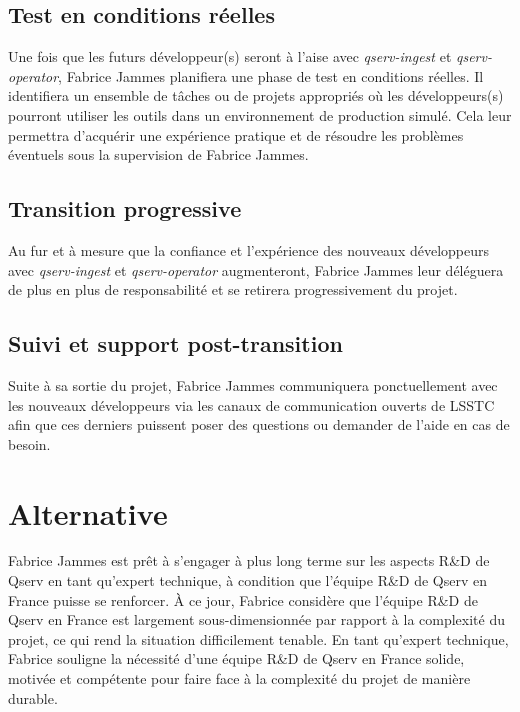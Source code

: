 \documentclass[french] {article}
\begin{document}
\subsection{Test en conditions réelles}

Une fois que les futurs développeur(s) seront à l'aise avec \textit{qserv-ingest} et \textit{qserv-operator}, Fabrice Jammes planifiera une phase de test en conditions réelles. Il identifiera un
ensemble de tâches ou de projets appropriés où les développeurs(s) pourront utiliser les outils dans un environnement de production simulé. Cela leur permettra d'acquérir une expérience pratique
et de résoudre les problèmes éventuels sous la supervision de Fabrice Jammes.

\subsection{Transition progressive}

Au fur et à mesure que la confiance et l'expérience des nouveaux développeurs avec \textit{qserv-ingest} et \textit{qserv-operator} augmenteront, Fabrice Jammes leur déléguera de plus en plus de
responsabilité et se retirera progressivement du projet.

\subsection{Suivi et support post-transition}

Suite à sa sortie du projet, Fabrice Jammes communiquera ponctuellement avec les nouveaux développeurs via les canaux de communication ouverts de LSSTC afin que ces derniers puissent poser
des questions ou demander de l'aide en cas de besoin.

\section{Alternative}

Fabrice Jammes est prêt à s'engager à plus long terme sur les aspects R\&D de Qserv en tant qu'expert technique, à condition que l'équipe R\&D de Qserv en France puisse se renforcer. À ce jour, Fabrice considère
que l'équipe R\&D de Qserv en France est largement sous-dimensionnée par rapport à la complexité du projet, ce qui rend la situation difficilement tenable. En tant qu'expert technique,  Fabrice souligne la nécessité
d'une équipe R\&D de Qserv en France solide, motivée et compétente pour faire face à la complexité du projet de manière durable.
\end{document}
